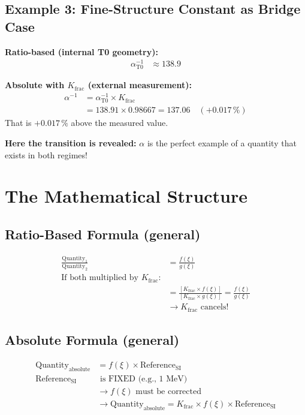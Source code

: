 	\subsection{Example 3: Fine-Structure Constant as Bridge Case}
	
	\textbf{Ratio-based (internal T0 geometry):}
	\begin{align*}
		\alpha_{\text{T0}}^{-1} &\approx 138.9
	\end{align*}
	
	\textbf{Absolute with $K_{\text{frac}}$ (external measurement):}
	\begin{align*}
		\alpha^{-1} &= \alpha_{\text{T0}}^{-1} \times K_{\text{frac}} \\
		&= 138.91 \times 0.98667 = 137.06 \quad (+0.017\,\%)
	\end{align*}
	That is $+0.017\,\%$ above the measured value.
	
	\textbf{Here the transition is revealed:} $\alpha$ is the perfect example of a quantity that exists in both regimes!
	
	\section{The Mathematical Structure}
	
	\subsection{Ratio-Based Formula (general)}
	\begin{align*}
		\frac{\text{Quantity}_1}{\text{Quantity}_2} &= \frac{f(\xi)}{g(\xi)} \\
		\text{If both multiplied by $K_{\text{frac}}$:} & \\
		&= \frac{[K_{\text{frac}} \times f(\xi)]}{[K_{\text{frac}} \times g(\xi)]} = \frac{f(\xi)}{g(\xi)} \\
		&\rightarrow K_{\text{frac}} \text{ cancels!}
	\end{align*}
	
	\subsection{Absolute Formula (general)}
	\begin{align*}
		\text{Quantity}_{\text{absolute}} &= f(\xi) \times \text{Reference}_{\text{SI}} \\
		\text{Reference}_{\text{SI}} &\text{ is FIXED (e.g., 1 MeV)} \\
		&\rightarrow f(\xi) \text{ must be corrected} \\
		&\rightarrow \text{Quantity}_{\text{absolute}} = K_{\text{frac}} \times f(\xi) \times \text{Reference}_{\text{SI}}
	\end{align*}
	
